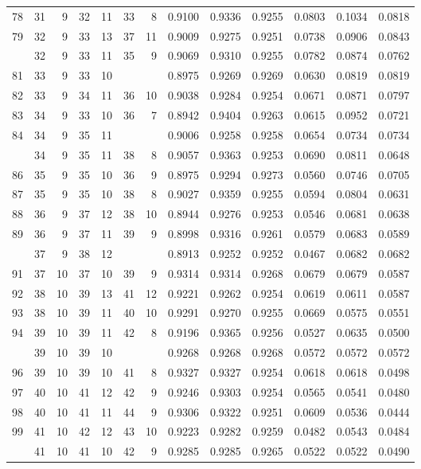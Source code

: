 \begin{Schunk}
\begin{longtable}{rrrrrrrrrrrrr}
78 & 31 & 9 & 32 & 11 & 33 & 8 & 0.9100 & 0.9336 & 0.9255 & 0.0803 & 0.1034 & 0.0818\\
79 & 32 & 9 & 33 & 13 & 37 & 11 & 0.9009 & 0.9275 & 0.9251 & 0.0738 & 0.0906 & 0.0843\\
\addlinespace
80 & 32 & 9 & 33 & 11 & 35 & 9 & 0.9069 & 0.9310 & 0.9255 & 0.0782 & 0.0874 & 0.0762\\
81 & 33 & 9 & 33 & 10 &  &  & 0.8975 & 0.9269 & 0.9269 & 0.0630 & 0.0819 & 0.0819\\
82 & 33 & 9 & 34 & 11 & 36 & 10 & 0.9038 & 0.9284 & 0.9254 & 0.0671 & 0.0871 & 0.0797\\
83 & 34 & 9 & 33 & 10 & 36 & 7 & 0.8942 & 0.9404 & 0.9263 & 0.0615 & 0.0952 & 0.0721\\
84 & 34 & 9 & 35 & 11 &  &  & 0.9006 & 0.9258 & 0.9258 & 0.0654 & 0.0734 & 0.0734\\
\addlinespace
85 & 34 & 9 & 35 & 11 & 38 & 8 & 0.9057 & 0.9363 & 0.9253 & 0.0690 & 0.0811 & 0.0648\\
86 & 35 & 9 & 35 & 10 & 36 & 9 & 0.8975 & 0.9294 & 0.9273 & 0.0560 & 0.0746 & 0.0705\\
87 & 35 & 9 & 35 & 10 & 38 & 8 & 0.9027 & 0.9359 & 0.9255 & 0.0594 & 0.0804 & 0.0631\\
88 & 36 & 9 & 37 & 12 & 38 & 10 & 0.8944 & 0.9276 & 0.9253 & 0.0546 & 0.0681 & 0.0638\\
89 & 36 & 9 & 37 & 11 & 39 & 9 & 0.8998 & 0.9316 & 0.9261 & 0.0579 & 0.0683 & 0.0589\\
\addlinespace
90 & 37 & 9 & 38 & 12 &  &  & 0.8913 & 0.9252 & 0.9252 & 0.0467 & 0.0682 & 0.0682\\
91 & 37 & 10 & 37 & 10 & 39 & 9 & 0.9314 & 0.9314 & 0.9268 & 0.0679 & 0.0679 & 0.0587\\
92 & 38 & 10 & 39 & 13 & 41 & 12 & 0.9221 & 0.9262 & 0.9254 & 0.0619 & 0.0611 & 0.0587\\
93 & 38 & 10 & 39 & 11 & 40 & 10 & 0.9291 & 0.9270 & 0.9255 & 0.0669 & 0.0575 & 0.0551\\
94 & 39 & 10 & 39 & 11 & 42 & 8 & 0.9196 & 0.9365 & 0.9256 & 0.0527 & 0.0635 & 0.0500\\
\addlinespace
95 & 39 & 10 & 39 & 10 &  &  & 0.9268 & 0.9268 & 0.9268 & 0.0572 & 0.0572 & 0.0572\\
96 & 39 & 10 & 39 & 10 & 41 & 8 & 0.9327 & 0.9327 & 0.9254 & 0.0618 & 0.0618 & 0.0498\\
97 & 40 & 10 & 41 & 12 & 42 & 9 & 0.9246 & 0.9303 & 0.9254 & 0.0565 & 0.0541 & 0.0480\\
98 & 40 & 10 & 41 & 11 & 44 & 9 & 0.9306 & 0.9322 & 0.9251 & 0.0609 & 0.0536 & 0.0444\\
99 & 41 & 10 & 42 & 12 & 43 & 10 & 0.9223 & 0.9282 & 0.9259 & 0.0482 & 0.0543 & 0.0484\\
\addlinespace
100 & 41 & 10 & 41 & 10 & 42 & 9 & 0.9285 & 0.9285 & 0.9265 & 0.0522 & 0.0522 & 0.0490\\*
\end{longtable}

\end{Schunk}


